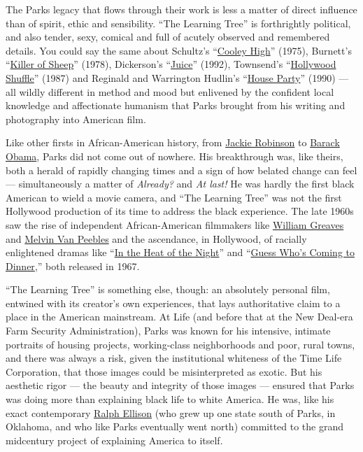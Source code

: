 The Parks legacy that flows through their work is less a matter of
direct influence than of spirit, ethic and sensibility. ``The Learning
Tree'' is forthrightly political, and also tender, sexy, comical and
full of acutely observed and remembered details. You could say the same
about Schultz's
``\href{https://www.nytimes.com/watching/titles/movies/1000120485}{Cooley
High}'' (1975), Burnett's
``\href{https://www.imdb.com/title/tt0076263/}{Killer of Sheep}''
(1978), Dickerson's
``\href{https://www.nytimes.com/watching/titles/movies/1000121318}{Juice}''
(1992), Townsend's
``\href{https://www.nytimes.com/watching/titles/movies/1000022175}{Hollywood
Shuffle}'' (1987) and Reginald and Warrington Hudlin's
``\href{https://www.nytimes.com/watching/titles/house-party}{House
Party}'' (1990) --- all wildly different in method and mood but
enlivened by the confident local knowledge and affectionate humanism
that Parks brought from his writing and photography into American film.

Like other firsts in African-American history, from
\href{https://www.nytimes.com/topic/person/jackie-robinson}{Jackie
Robinson} to
\href{https://www.nytimes.com/topic/person/barack-obama}{Barack Obama},
Parks did not come out of nowhere. His breakthrough was, like theirs,
both a herald of rapidly changing times and a sign of how belated change
can feel --- simultaneously a matter of \emph{Already?} and \emph{At
last!} He was hardly the first black American to wield a movie camera,
and ``The Learning Tree'' was not the first Hollywood production of its
time to address the black experience. The late 1960s saw the rise of
independent African-American filmmakers like
\href{https://www.nytimes.com/2014/08/27/arts/william-greaves-a-documentarian-and-pioneering-journalist-dies-at-87.html}{William
Greaves} and
\href{https://www.nytimes.com/2013/09/20/arts/design/melvin-van-peebles-headlines-a-group-art-show.html}{Melvin
Van Peebles} and the ascendance, in Hollywood, of racially enlightened
dramas like
``\href{https://www.nytimes.com/watching/recommendations/watching-film-in-the-heat-of-the-night}{In
the Heat of the Night}'' and
``\href{https://www.nytimes.com/watching/titles/guess-whos-coming-to-dinner}{Guess
Who's Coming to Dinner},'' both released in 1967.

``The Learning Tree'' is something else, though: an absolutely personal
film, entwined with its creator's own experiences, that lays
authoritative claim to a place in the American mainstream. At Life (and
before that at the New Deal-era Farm Security Administration), Parks was
known for his intensive, intimate portraits of housing projects,
working-class neighborhoods and poor, rural towns, and there was always
a risk, given the institutional whiteness of the Time Life Corporation,
that those images could be misinterpreted as exotic. But his aesthetic
rigor --- the beauty and integrity of those images --- ensured that
Parks was doing more than explaining black life to white America. He
was, like his exact contemporary
\href{https://www.nytimes.com/topic/person/ralph-ellison}{Ralph Ellison}
(who grew up one state south of Parks, in Oklahoma, and who like Parks
eventually went north) committed to the grand midcentury project of
explaining America to itself.

